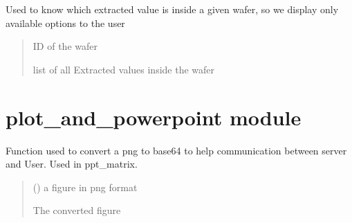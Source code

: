 \documentclass[letterpaper,10pt,english]{sphinxmanual}
\begin{document}
\begin{fulllineitems}
\label{\detokenize{normal_plots:normal_plots.get_values}}
\pysigstartsignatures
{}
\pysigstopsignatures
\sphinxAtStartPar
Used to know which extracted value is inside a given wafer, so we display only available options to the user
\begin{quote}\begin{description}
\sphinxAtStartPar
{} \textendash{} ID of the wafer

\sphinxAtStartPar
list of all Extracted values inside the wafer

\end{description}\end{quote}

\end{fulllineitems}


\sphinxstepscope


\section{plot\_and\_powerpoint module}
\label{\detokenize{plot_and_powerpoint:module-plot_and_powerpoint}}\label{\detokenize{plot_and_powerpoint:plot-and-powerpoint-module}}\label{\detokenize{plot_and_powerpoint::doc}}

\begin{fulllineitems}
\label{\detokenize{plot_and_powerpoint:plot_and_powerpoint.fig_to_base64}}
\pysigstartsignatures
{}
\pysigstopsignatures
\sphinxAtStartPar
Function used to convert a png to base64 to help communication between server and User. Used in ppt\_matrix.
\begin{quote}\begin{description}
\sphinxAtStartPar
{} () \textendash{} a figure in png format

\sphinxAtStartPar
The converted figure

\end{description}\end{quote}

\end{fulllineitems}
\end{document}
